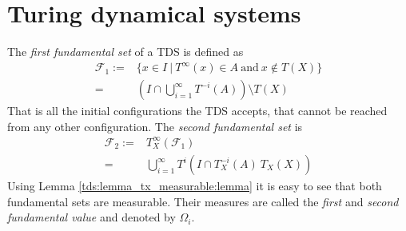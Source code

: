 \section{Turing dynamical systems} \label{tds}





The \emph{first fundamental set} of a TDS is defined as
\begin{align*}
	\mathcal{F}_1 :=&\{ x \in I~|~T^\infty(x) \in A~\text{and}~x \notin T(X) \} \\
	=&(I \cap \bigcup_{i=1}^\infty T^{-i}(A)) \setminus T(X)
\end{align*}
That is all the initial configurations the TDS accepts, that cannot be reached from any other configuration.
The \emph{second fundamental set} is
\begin{align*}
	\mathcal{F}_2 :=&T_X^\infty(\mathcal{F}_1) \\
	=&\bigcup_{i=1}^\infty T^i( I \cap T_X^{-i}(A) \ T_X(X))
\end{align*}
Using Lemma \ref{tds:lemma_tx_measurable:lemma} it is easy to see that both fundamental sets are measurable.
Their measures are called the \emph{first} and \emph{second fundamental value} and denoted by $\Omega_i$.

